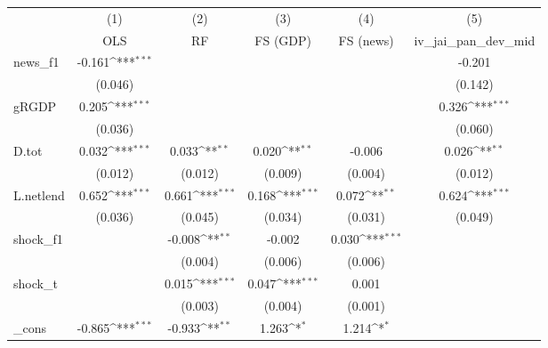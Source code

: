 {
\def\sym#1{\ifmmode^{#1}\else\(^{#1}\)\fi}
\begin{tabular}{l*{5}{c}}
\toprule
            &\multicolumn{1}{c}{(1)}&\multicolumn{1}{c}{(2)}&\multicolumn{1}{c}{(3)}&\multicolumn{1}{c}{(4)}&\multicolumn{1}{c}{(5)}\\
            &\multicolumn{1}{c}{OLS}&\multicolumn{1}{c}{RF}&\multicolumn{1}{c}{FS (GDP)}&\multicolumn{1}{c}{FS (news)}&\multicolumn{1}{c}{iv\_jai\_pan\_dev\_mid}\\
\midrule
news\_f1     &      -0.161\sym{***}&                     &                     &                     &      -0.201         \\
            &     (0.046)         &                     &                     &                     &     (0.142)         \\
\addlinespace
gRGDP       &       0.205\sym{***}&                     &                     &                     &       0.326\sym{***}\\
            &     (0.036)         &                     &                     &                     &     (0.060)         \\
\addlinespace
D.tot       &       0.032\sym{***}&       0.033\sym{**} &       0.020\sym{**} &      -0.006         &       0.026\sym{**} \\
            &     (0.012)         &     (0.012)         &     (0.009)         &     (0.004)         &     (0.012)         \\
\addlinespace
L.netlend   &       0.652\sym{***}&       0.661\sym{***}&       0.168\sym{***}&       0.072\sym{**} &       0.624\sym{***}\\
            &     (0.036)         &     (0.045)         &     (0.034)         &     (0.031)         &     (0.049)         \\
\addlinespace
shock\_f1    &                     &      -0.008\sym{**} &      -0.002         &       0.030\sym{***}&                     \\
            &                     &     (0.004)         &     (0.006)         &     (0.006)         &                     \\
\addlinespace
shock\_t     &                     &       0.015\sym{***}&       0.047\sym{***}&       0.001         &                     \\
            &                     &     (0.003)         &     (0.004)         &     (0.001)         &                     \\
\addlinespace
\_cons      &      -0.865\sym{***}&      -0.933\sym{**} &       1.263\sym{*}  &       1.214\sym{*}  &                     \\

\end{tabular}}

